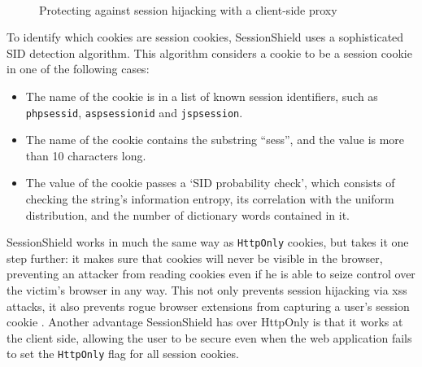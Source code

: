 \begin{figure}[htb]
	\centering
	\\
	\caption{Protecting against session hijacking with a client-side proxy}
	\label{fig:nikiforakis}
\end{figure}

To identify which cookies are session cookies, SessionShield uses a sophisticated SID detection algorithm. This algorithm considers a cookie to be a session cookie in one of the following cases:
\begin{itemize}
	\item The name of the cookie is in a list of known session identifiers, such as \texttt{phpsessid}, \texttt{aspsessionid} and \texttt{jspsession}.
	\item The name of the cookie contains the substring ``sess'', and the value is more than 10 characters long.
	\item The value of the cookie passes a `SID probability check', which consists of checking the string's information entropy, its correlation with the uniform distribution, and the number of dictionary words contained in it.
\end{itemize}

SessionShield works in much the same way as \texttt{HttpOnly} cookies, but takes it one step further: it makes sure that cookies will never be visible in the browser, preventing an attacker from reading cookies even if he is able to seize control over the victim's browser in any way. This not only prevents session hijacking via \gls{xss} attacks, it also prevents rogue browser extensions from capturing a user's session cookie \cite{TerLouw2007}. Another advantage SessionShield has over HttpOnly is that it works at the client side, allowing the user to be secure even when the web application fails to set the \texttt{HttpOnly} flag for all session cookies.


